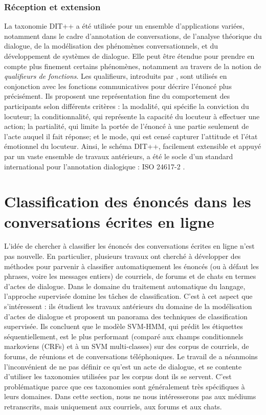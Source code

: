 \documentclass[10pt,a4paper,twoside]{article}
\begin{document}
\subsubsection{Réception et extension}

La taxonomie DIT++ a été utilisée pour un ensemble d'applications variées, notamment dans le cadre d'annotation de conversations, de l'analyse théorique du dialogue, de la modélisation des phénomènes conversationnels, et du développement de systèmes de dialogue. Elle peut être étendue pour prendre en compte plus finement certains phénomènes, notamment au travers de la notion de \textit{qualifieurs de fonctions}. Les qualifieurs, introduits par \citet{petukhova2010introducing}, sont utilisés en conjonction avec les fonctions communicatives pour décrire l'énoncé plus précisément. Ils proposent une représentation fine du comportement des participants selon différents critères : la modalité, qui spécifie la conviction du locuteur; la conditionnalité, qui représente la capacité du locuteur à effectuer une action; la partialité, qui limite la portée de l'énoncé à une partie seulement de l'acte auquel il fait réponse; et le mode, qui est censé capturer l'attitude et l'état émotionnel du locuteur. Ainsi, le schéma DIT++, facilement extensible et appuyé par un vaste ensemble de travaux antérieurs, a été le socle d'un standard international pour l'annotation dialogique : ISO 24617-2 \cite{bunt2012iso}.

\section{Classification des énoncés dans les conversations écrites en ligne }
\label{sec:online_written_conversation_analysis}

L'idée de chercher à classifier les énoncés des conversations écrites en ligne n'est pas nouvelle. En particulier, plusieurs travaux ont cherché à développer des méthodes pour parvenir à classifier automatiquement les énoncés (ou à défaut les phrases, voire les messages entiers) de courriels, de forums et de chats en termes d'actes de dialogue. Dans le domaine du traitement automatique du langage, l'approche supervisée domine les tâches de classification. C'est à cet aspect que s'intéressent \citet{tavafi2013dialogue} : ils étudient les travaux antérieurs du domaine de la modélisation d'actes de dialogue et proposent un panorama des techniques de classification supervisée. Ils concluent que le modèle SVM-HMM, qui prédit les étiquettes séquentiellement, est le plus performant (comparé aux champs conditionnels markoviens (CRFs) et à un SVM multi-classes) sur des corpus de courriels, de forums, de réunions et de conversations téléphoniques. Le travail de \citeauthor{tavafi2013dialogue} a néanmoins l'inconvénient de ne pas définir ce qu'est un acte de dialogue, et se contente d'utiliser les taxonomies utilisées par les corpus dont ils se servent. C'est problématique parce que ces taxonomies sont généralement très spécifiques à leurs domaines. Dans cette section, nous ne nous intéresserons pas aux médiums retranscrits, mais uniquement aux courriels, aux forums et aux chats.
\end{document}
